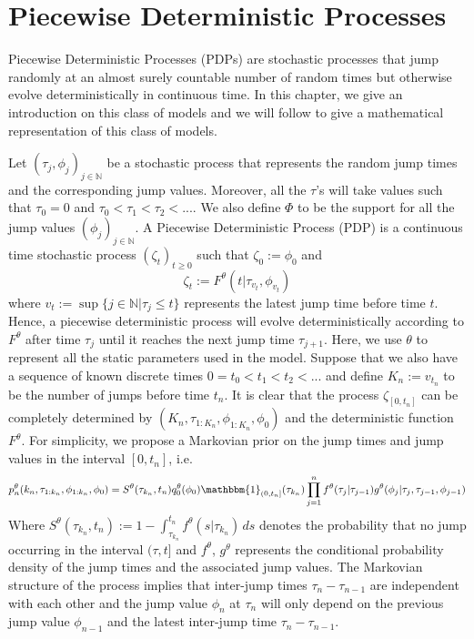 \documentclass[12pt,a4paper]{article}
\begin{document}
\section{Piecewise Deterministic Processes}
Piecewise Deterministic Processes (PDPs) are stochastic processes that jump randomly at an almost surely countable number of random times but otherwise evolve deterministically in continuous time. In this chapter, we give an introduction on this class of models and we will follow to give a mathematical representation of this class of models.

Let $(\tau_j,\phi_j)_{j \in \mathbb{N}}$ be a stochastic process that represents the random jump times and the corresponding jump values. Moreover, all the $\tau$'s will take values such that $\tau_0 = 0$ and $\tau_0<\tau_1<\tau_2<...$. We also define $\Phi$ to be the support for all the jump values $(\phi_j)_{j \in \mathbb{N}}$. A Piecewise Deterministic Process (PDP) is a continuous time stochastic process $(\zeta_t)_{t \geq 0}$ such that $\zeta_0 := \phi_0$ and 
$$\zeta_t := F^{\theta}(t|\tau_{v_t},\phi_{v_t})$$
where $v_t := \sup \{j \in \mathbb{N}|\tau_j \leq t \}$ represents the latest jump time before time $t$. Hence, a piecewise deterministic process will evolve deterministically according to $F^{\theta}$ after time $\tau_{j}$ until it reaches the next jump time $\tau_{j+1}$. Here, we use $\theta$ to represent all the static parameters used in the model. Suppose that we also have a sequence of known discrete times $0=t_0<t_1<t_2<...$ and define $K_n := v_{t_n}$ to be the number of jumps before time $t_n$. It is clear that the process $\zeta_{[0,t_n]}$ can be completely determined by $\left(K_n,\tau_{1:K_n},\phi_{1:K_n},\phi_0\right)$ and the deterministic function \(F^{\theta}\). For simplicity, we propose a Markovian prior on the jump times and jump values in the interval $[0,t_n]$, i.e.
\begin{equation}
\label{eqn:Chap1-PDMP-Prior}
    p_n^{\theta}(k_n,\tau_{1:k_n},\phi_{1:k_n},\phi_0) = S^{\theta}(\tau_{k_n},t_n)q_0^{\theta}(\phi_0)\mathbbm{1}_{(0,t_n]}(\tau_{k_n})\prod_{j=1}^{n} f^{\theta}(\tau_j|\tau_{j-1}) g^{\theta}(\phi_j|\tau_j,\tau_{j-1},\phi_{j-1})
\end{equation}
Where \(S^{\theta}(\tau_{k_n},t_n):= 1- \int_{\tau_{k_n}}^{t_n} f^{\theta}(s|\tau_{k_n})\,ds\) denotes the probability that no jump occurring in the interval $(\tau,t]$ and $f^{\theta}$, $g^{\theta}$ represents the conditional probability density of the jump times and the associated jump values. The Markovian structure of the process implies that inter-jump times $\tau_n - \tau_{n-1}$ are independent with each other and the jump value $\phi_n$ at $\tau_n$ will only depend on the previous jump value $\phi_{n-1}$ and the latest inter-jump time $\tau_n - \tau_{n-1}$.
\end{document}

